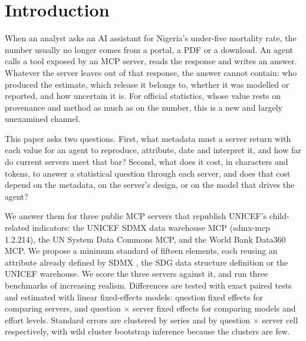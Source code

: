 \documentclass[11pt,a4paper]{article}
\begin{document}
\section{Introduction}\label{sec:intro}

When an analyst asks an AI assistant for Nigeria's under-five mortality rate, the number usually no longer comes from a portal, a PDF or a download. An agent calls a tool exposed by an MCP server, reads the response and writes an answer. Whatever the server leaves out of that response, the answer cannot contain: who produced the estimate, which release it belongs to, whether it was modelled or reported, and how uncertain it is. For official statistics, whose value rests on provenance and method as much as on the number, this is a new and largely unexamined channel.

This paper asks two questions. First, what metadata must a server return with each value for an agent to reproduce, attribute, date and interpret it, and how far do current servers meet that bar? Second, what does it cost, in characters and tokens, to answer a statistical question through each server, and does that cost depend on the metadata, on the server's design, or on the model that drives the agent?

We answer them for three public MCP servers that republish UNICEF's child-related indicators: the UNICEF SDMX data warehouse MCP (sdmx-mcp 1.2.214), the UN System Data Commons MCP, and the World Bank Data360 MCP. We propose a minimum standard of fifteen elements, each reusing an attribute already defined by SDMX \citep{sdmx}, the SDG data structure definition \citep{unsd2019} or the UNICEF warehouse. We score the three servers against it, and run three benchmarks of increasing realism. Differences are tested with exact paired tests and estimated with linear fixed-effects models: question fixed effects for comparing servers, and question $\times$ server fixed effects for comparing models and effort levels. Standard errors are clustered by series and by question $\times$ server cell respectively, with wild cluster bootstrap inference because the clusters are few.
\end{document}
